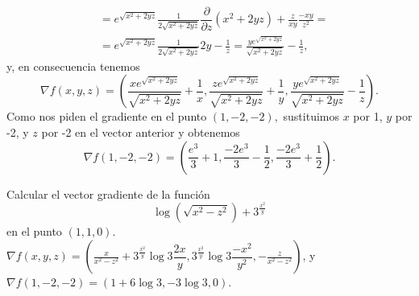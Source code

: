 {\begin{align*}
&= e^{\sqrt{x^2+2yz}}\frac{1}{2\sqrt{x^2+2yz}}\dfrac{\partial}{\partial z}(x^2+2yz)+\frac{z}{xy}\frac{-xy}{z^2}= \\
&= e^{\sqrt{x^2+2yz}}\frac{1}{2\sqrt{x^2+2yz}}2y-\frac{1}{z} = \frac{ye^{\sqrt{x^2+2yz}}}{\sqrt{x^2+2yz}}-\frac{1}{z},
\end{align*}
y, en consecuencia tenemos
\[
\nabla f(x,y,z)=\left(\frac{xe^{\sqrt{x^2+2yz}}}{\sqrt{x^2+2yz}}+\frac{1}{x}, \frac{ze^{\sqrt{x^2+2yz}}}{\sqrt{x^2+2yz}}+\frac{1}{y}, \frac{ye^{\sqrt{x^2+2yz}}}{\sqrt{x^2+2yz}}-\frac{1}{z}\right).
\]
Como nos piden el gradiente en el punto $(1,-2,-2),$ sustituimos $x$ por 1, $y$ por -2, y $z$ por -2 en el vector anterior y obtenemos
\[
\nabla f(1,-2,-2)=\left(\frac{e^3}{3}+1,\frac{-2e^3}{3}-\frac{1}{2},\frac{-2e^3}{3}+\frac{1}{2}\right).
\]
}


{Calcular el vector gradiente de la función
\[
\log \left( \sqrt{x^{2}-z^{2}}\right) +3^{\tfrac{x^{2}}{y}}
\]
en el punto $(1,1,0)$.
}
{$\nabla f(x,y,z)=(\frac{x}{x^{2}-z^{2}}+3^{\tfrac{x^{2}}{y}}\log 3\dfrac{2x}{y},3^{\tfrac{x^{2}}{y}}\log 3\dfrac{-x^{2}}{y^{2}},-\frac{z}{x^{2}-z^{2}})$, y $\nabla f(1,-2,-2)=(1+6\log 3,-3\log 3,0)$.
}

